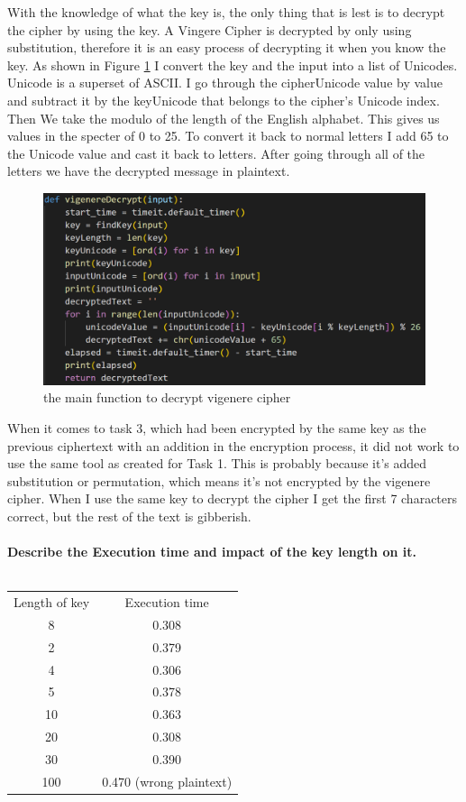 \documentclass[12pt, letterpaper]{article}
\begin{document}
With the knowledge of what the key is, the only thing that is lest is to decrypt the cipher by using the key. A Vingere Cipher is decrypted by only using substitution, therefore it is an easy process of decrypting it when you know the key. As shown in Figure \ref{fig:vigenereDecrypt} I convert the key and the input into a list of Unicodes. Unicode is a superset of ASCII. I go through the cipherUnicode value by value and subtract it by the keyUnicode that belongs to the cipher's Unicode index. Then We take the modulo of the length of the English alphabet. This gives us values in the specter of 0 to 25. To convert it back to normal letters I add 65 to the Unicode value and cast it back to letters. After going through all of the letters we have the decrypted message in plaintext.

\begin{figure}[H]
  \includegraphics[width=\linewidth]{code_snippets/vigenereDecrypt.PNG}
  \caption{the main function to decrypt vigenere cipher}
  \label{fig:vigenereDecrypt}
\end{figure} 


When it comes to task 3, which had been encrypted by the same key as the previous ciphertext with an addition in the encryption process, it did not work to use the same tool as created for Task 1. This is probably because it's added substitution or permutation, which means it's not encrypted by the vigenere cipher. When I use the same key to decrypt the cipher I get the first 7 characters correct, but the rest of the text is gibberish.
\\ \\
\textbf{Describe the Execution time and impact of the key length on it.}
\\ \\
\begin{center}
\begin{tabular}{ |c|c| } 
 \hline
 Length of key & Execution time \\
 8 & 0.308 \\ 
 2 & 0.379 \\
 4 & 0.306 \\
 5 & 0.378 \\
 10 & 0.363 \\
 20 & 0.308 \\
 30 & 0.390 \\
 100 & 0.470 (wrong plaintext) \\
 \hline
\end{tabular}
\end{center}
\end{document}
